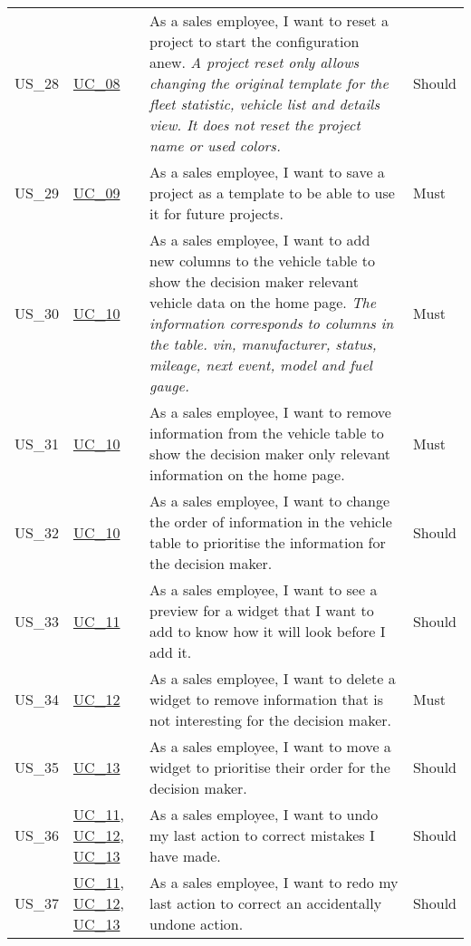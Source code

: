 \begin{footnotesize}
\begin{longtable}[L L L L]{ p{} p{} p{} p{} }
      \hypertarget{Ref:US28}{US\_28} & \hyperlink{Ref:UC8}{UC\_08} & As a sales employee, I want to reset a project to start the configuration anew. 
      \newline
      \emph{A project reset only allows changing the original template for the fleet statistic, vehicle list and details view. It does not reset the project name or used colors.} & Should \\
      \hypertarget{Ref:US29}{US\_29} & \hyperlink{Ref:UC9}{UC\_09} & As a sales employee, I want to save a project as a template to be able to use it for future projects. & Must \\
      \hypertarget{Ref:US30}{US\_30} & \hyperlink{Ref:UC10}{UC\_10} & As a sales employee, I want to add new columns to the vehicle table to show the decision maker relevant vehicle data on the home page.
      \newline
      \emph{The information corresponds to columns in the table. \gls{vin}, manufacturer, status, mileage, next event, model and fuel gauge.} & Must  \\
      \hypertarget{Ref:US31}{US\_31} & \hyperlink{Ref:UC10}{UC\_10} & As a sales employee, I want to remove information from the vehicle table to show the decision maker only relevant information on the home page. & Must  \\
      \hypertarget{Ref:US32}{US\_32} & \hyperlink{Ref:UC10}{UC\_10} & As a sales employee, I want to change the order of information in the vehicle table to prioritise the information for the decision maker. & Should  \\

      \hypertarget{Ref:US33}{US\_33} & \hyperlink{Ref:UC11}{UC\_11} & As a sales employee, I want to see a preview for a \gls{widget} that I want to add to know how it will look before I add it. & Should \\
      \hypertarget{Ref:US34}{US\_34} & \hyperlink{Ref:UC12}{UC\_12} & As a sales employee, I want to delete a \gls{widget} to remove information that is not interesting for the decision maker. & Must \\
      \hypertarget{Ref:US35}{US\_35} & \hyperlink{Ref:UC13}{UC\_13} \  & As a sales employee, I want to move a \gls{widget} to prioritise their order for the decision maker. & Should \\
      \hypertarget{Ref:US36}{US\_36} & \hyperlink{Ref:UC11}{UC\_11}, \newline \hyperlink{Ref:UC12}{UC\_12}, \newline \hyperlink{Ref:UC13}{UC\_13} & As a sales employee, I want to undo my last action to correct mistakes I have made. & Should \\
      \hypertarget{Ref:US37}{US\_37} & \hyperlink{Ref:UC11}{UC\_11}, \newline \hyperlink{Ref:UC12}{UC\_12}, \newline \hyperlink{Ref:UC13}{UC\_13} & As a sales employee, I want to redo my last action to correct an accidentally undone action. & Should \\
      \bottomrule
    \end{longtable}
  \end{footnotesize}
